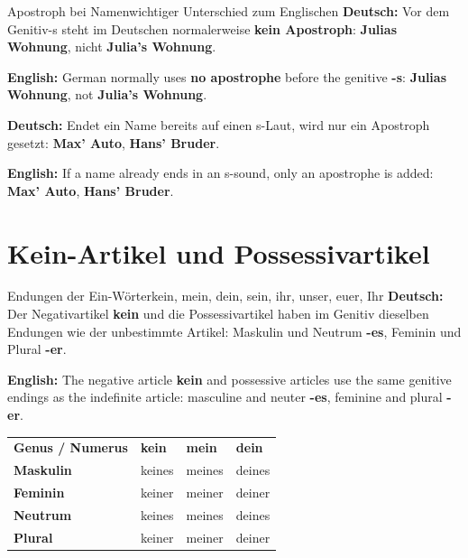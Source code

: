 \documentclass[a4paper,11pt]{article}
\newcommand{\GermanText}[1]{\textbf{Deutsch: }#1\par}
\newcommand{\EnglishText}[1]{{\small\color{SoftGray}\textbf{English: }#1\par}}
\begin{document}
        \begin{grammarentry}{Apostroph bei Namen}{wichtiger Unterschied zum Englischen}
            \GermanText{Vor dem Genitiv-s steht im Deutschen normalerweise \textbf{kein Apostroph}: \textbf{Julias Wohnung}, nicht \textbf{Julia's Wohnung}.}
            \EnglishText{German normally uses \textbf{no apostrophe} before the genitive \textbf{-s}: \textbf{Julias Wohnung}, not \textbf{Julia's Wohnung}.}

            \GermanText{Endet ein Name bereits auf einen s-Laut, wird nur ein Apostroph gesetzt: \textbf{Max' Auto}, \textbf{Hans' Bruder}.}
            \EnglishText{If a name already ends in an s-sound, only an apostrophe is added: \textbf{Max' Auto}, \textbf{Hans' Bruder}.}
        \end{grammarentry}

    \section{Kein-Artikel und Possessivartikel}

        \begin{grammarentry}{Endungen der Ein-Wörter}{kein, mein, dein, sein, ihr, unser, euer, Ihr}
            \GermanText{Der Negativartikel \textbf{kein} und die Possessivartikel haben im Genitiv dieselben Endungen wie der unbestimmte Artikel: Maskulin und Neutrum \textbf{-es}, Feminin und Plural \textbf{-er}.}
            \EnglishText{The negative article \textbf{kein} and possessive articles use the same genitive endings as the indefinite article: masculine and neuter \textbf{-es}, feminine and plural \textbf{-er}.}
        \end{grammarentry}

        \begin{longtable}{>{\bfseries}p{3.2cm}|>{\centering\arraybackslash}p{3.2cm}|>{\centering\arraybackslash}p{3.2cm}|>{\centering\arraybackslash}p{3.2cm}}
            \rowcolor{HeaderBlueDark}
            \color{white}\textbf{Genus / Numerus} &
            \color{white}\textbf{kein} &
            \color{white}\textbf{mein} &
            \color{white}\textbf{dein} \\
            Maskulin & keines & meines & deines \\
            Feminin & keiner & meiner & deiner \\
            Neutrum & keines & meines & deines \\
            Plural & keiner & meiner & deiner \\
        \end{longtable}
\end{document}
